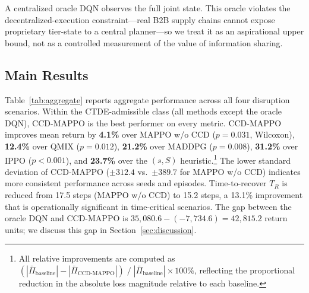 \documentclass[11pt,a4paper]{article}
\theoremstyle{plain}
\theoremstyle{definition}
\begin{document}
A centralized oracle DQN observes the full joint state.  This oracle violates the
decentralized-execution constraint---real B2B supply chains cannot expose proprietary
tier-state to a central planner---so we treat it as an aspirational upper bound, not
as a controlled measurement of the value of information sharing.

\subsection{Main Results}
\label{sec:main}

Table~\ref{tab:aggregate} reports aggregate performance across all four disruption
scenarios.  Within the CTDE-admissible class (all methods except the oracle DQN),
CCD-MAPPO is the best performer on every metric.  CCD-MAPPO improves mean return by
\textbf{4.1\%} over MAPPO w/o CCD ($p=0.031$, Wilcoxon), \textbf{12.4\%} over QMIX
($p=0.012$), \textbf{21.2\%} over MADDPG ($p=0.008$), \textbf{31.2\%} over IPPO
($p<0.001$), and \textbf{23.7\%} over the $(s,S)$ heuristic.\footnote{All relative
improvements are computed as $(|\bar\Pi_{\text{baseline}}| -
|\bar\Pi_{\text{CCD-MAPPO}}|)\;/\;|\bar\Pi_{\text{baseline}}|\times100\%$, reflecting
the proportional reduction in the absolute loss magnitude relative to each baseline.}
The lower standard deviation of CCD-MAPPO ($\pm312.4$ vs.\ $\pm389.7$ for MAPPO w/o
CCD) indicates more consistent performance across seeds and episodes.  Time-to-recover
$T_R$ is reduced from 17.5 steps (MAPPO w/o CCD) to 15.2 steps, a 13.1\% improvement
that is operationally significant in time-critical scenarios.  The gap between the oracle
DQN and CCD-MAPPO is $35{,}080.6-(-7{,}734.6)=42{,}815.2$ return units; we discuss this
gap in Section~\ref{sec:discussion}.
\end{document}
